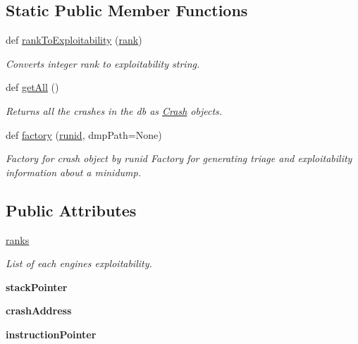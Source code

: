 \subsection*{Static Public Member Functions}
\begin{DoxyCompactItemize}
\item 
def \mbox{\hyperlink{classdb_1_1crash_1_1_crash_a2abc936fd748ececc054b54598614a8f}{rank\+To\+Exploitability}} (\mbox{\hyperlink{classdb_1_1crash_1_1_crash_affab729f1100b51839050c3a463d9086}{rank}})
\begin{DoxyCompactList}\small\item\em Converts integer rank to exploitability string. \end{DoxyCompactList}\item 
\mbox{\label{classdb_1_1crash_1_1_crash_a5edfc9fc84d5e6200a28f1d51d5a2570}} 
def \mbox{\hyperlink{classdb_1_1crash_1_1_crash_a5edfc9fc84d5e6200a28f1d51d5a2570}{get\+All}} ()
\begin{DoxyCompactList}\small\item\em Returns all the crashes in the db as \mbox{\hyperlink{classdb_1_1crash_1_1_crash}{Crash}} objects. \end{DoxyCompactList}\item 
def \mbox{\hyperlink{classdb_1_1crash_1_1_crash_affcb78bd66651217927efc4b77e48bd1}{factory}} (\mbox{\hyperlink{classdb_1_1crash_1_1_crash_a004548b6df7b106228b71b27c1aa1b2d}{runid}}, dmp\+Path=None)
\begin{DoxyCompactList}\small\item\em Factory for crash object by runid Factory for generating triage and exploitability information about a minidump. \end{DoxyCompactList}\end{DoxyCompactItemize}
\subsection*{Public Attributes}
\begin{DoxyCompactItemize}
\item 
\mbox{\hyperlink{classdb_1_1crash_1_1_crash_a0520e8dbb9d3f721df764f8e1fecaf8b}{ranks}}
\begin{DoxyCompactList}\small\item\em List of each engines exploitability. \end{DoxyCompactList}\item 
\mbox{\label{classdb_1_1crash_1_1_crash_ad01866789cb8428fe53dea8b380f5d65}} 
{\bfseries stack\+Pointer}
\item 
\mbox{\label{classdb_1_1crash_1_1_crash_af4683a563da71eadaa06ece350c1f377}} 
{\bfseries crash\+Address}
\item 
\mbox{\label{classdb_1_1crash_1_1_crash_a4603218ec3714c604cdfcd8330d2d45e}} 
{\bfseries instruction\+Pointer}
\end{DoxyCompactItemize}
